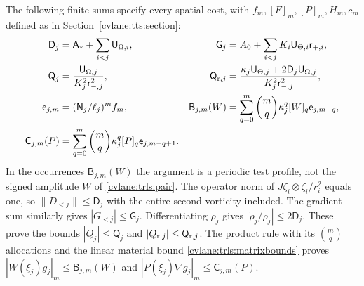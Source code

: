 The following finite sums specify every spatial cost, with
$f_m,[F]_m,[P]_m,H_m,c_m$ defined as in Section~\ref{cvlane:tts:section}:
\begin{align}\label{cvlane:trls:costdefinitions}
 \mathsf D_j&=\mathsf A_*+\sum_{i<j}\mathsf U_{\Omega,i},&
 \mathsf G_j&=A_0+\sum_{i<j}K_i\mathsf U_{\Theta,i}
                                      \mathsf r_{+,i},\nonumber\\
 \mathsf Q_j&=\frac{\mathsf U_{\Omega,j}}
                         {K_j^2\mathsf r_{-,j}^2},&
 \mathsf Q_{{\rm r},j}&=
 \frac{\mathsf\kappa_j\mathsf U_{\Theta,j}
                   +2\mathsf D_j\mathsf U_{\Omega,j}}
      {K_j^2\mathsf r_{-,j}^2},\\
 \mathsf e_{j,m}&=(\mathsf N_j/\ell_j)^mf_m,&
 \mathsf B_{j,m}(W)&=\sum_{q=0}^m\binom mq
          \mathsf\kappa_j^q[W]_q\mathsf e_{j,m-q},\nonumber\\
 \mathsf C_{j,m}(P)&=\sum_{q=0}^m\binom mq
          \mathsf\kappa_j^q[P]_q\mathsf e_{j,m-q+1}.&&\nonumber
\end{align}
In the occurrences $\mathsf B_{j,m}(W)$ the argument is a
periodic test profile, not the signed amplitude $W$ of
\eqref{cvlane:trls:pair}. The operator norm of
$J\zeta_i\otimes\zeta_i/r_i^2$ equals one, so
$\|D_{<j}\|\leq\mathsf D_j$ with the entire second
vorticity included. The gradient sum similarly gives
$|G_{<j}|\leq\mathsf G_j$. Differentiating
$\rho_j$ gives $|\dot\rho_j/\rho_j|\leq2\mathsf D_j$.
These prove the bounds $|Q_j|\leq\mathsf Q_j$ and
$|Q_{{\rm r},j}|\leq\mathsf Q_{{\rm r},j}$.
The product rule with its $\binom mq$ allocations and the
linear material bound \eqref{cvlane:trls:matrixbounds} proves
$|W(\xi_j)g_j|_m\leq\mathsf B_{j,m}(W)$ and
$|P(\xi_j)\nabla g_j|_m\leq\mathsf C_{j,m}(P)$.

